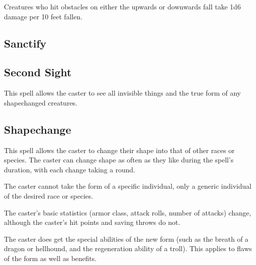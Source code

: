 \begin{multicols*}{2}
Creatures who hit obstacles on either the upwards or downwards fall take 1d6 damage per 10 feet fallen.

\subsection{Sanctify}\label{spell:Sanctify}



\subsection{Second Sight}\label{spell:Second Sight}

This spell allows the caster to see all invisible things and the true form of any shapechanged creatures.

\subsection{Shapechange}\label{spell:Shapechange}

This spell allows the caster to change their shape into that of other races or species. The caster can change shape as often as they like during the spell’s duration, with each change taking a round.

The caster cannot take the form of a specific individual, only a generic individual of the desired race or species.

The caster’s basic statistics (armor class, attack rolls, number of attacks) change, although the caster’s hit points and saving throws do not.

The caster does get the special abilities of the new form (such as the breath of a dragon or hellhound, and the regeneration ability of a troll). This applies to flaws of the form as well as benefits.


\end{multicols*}
